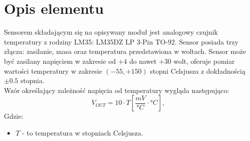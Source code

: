 \documentclass[11pt, a4paper]{article}
\author{Dawid Sobczak}
\begin{document}
%
%
\newpage

\section*{Opis elementu}
Sensorem składającym się na opisywany moduł jest analogowy czujnik temperatury z rodziny LM35: LM35DZ LP 3-Pin TO-92. Sensor posiada trzy złącza: zasilanie, masa oraz temperatura przedstawiona w woltach. Sensor może być zasilany napięciem w zakresie od $+4$ do nawet $+30$ wolt, oferuje pomiar wartości temperatury w zakresie $(-55,+150)$ stopni Celsjusza z dokładnością $\pm 0.5$ stopnia.\\

Wzór określający zależność napięcia od temperatury wygląda następująco:
\begin{equation}
    V_{OUT} = 10 \cdot T \left[ \frac{mV}{°C}\cdot °C\right],
    \label{wzor}
\end{equation}
Gdzie:
\begin{itemize}
    \item $T$ - to temperatura w stopniach Celsjusza.
\end{itemize}
\vspace{0.25cm}
\end{document}
